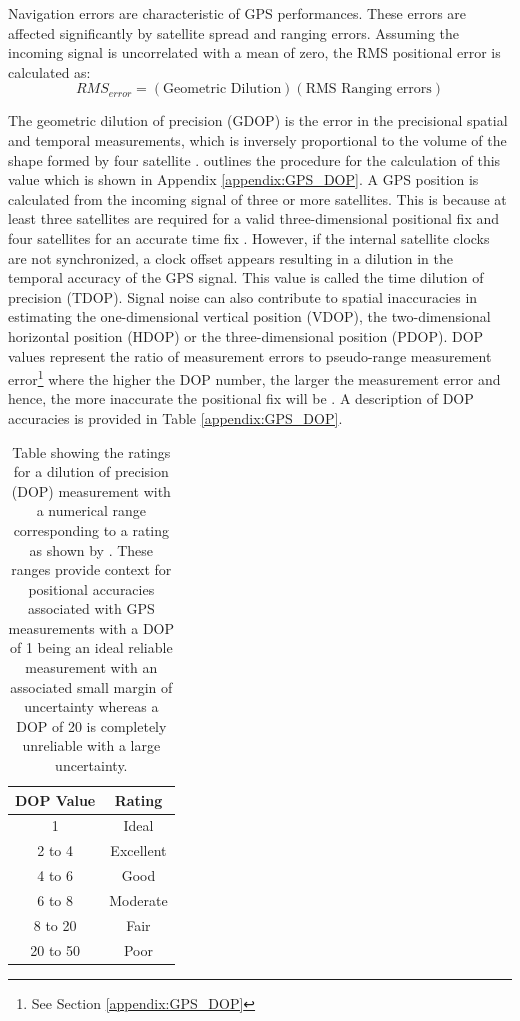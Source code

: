 Navigation errors are characteristic of GPS performances. These errors are affected significantly by satellite spread and ranging errors. Assuming the incoming signal is uncorrelated with a mean of zero, the RMS positional error is calculated as:
\begin{equation}
	RMS_{error} = (\text{Geometric Dilution})(\text{RMS Ranging errors})
\end{equation}

The geometric dilution of precision (GDOP) is the error in the precisional spatial and temporal measurements, which is inversely proportional to the volume of the shape formed by four satellite \cite{jwo2001efficient}. \textcite{jwo2001efficient} outlines the procedure for the calculation of this value which is shown in Appendix \ref{appendix:GPS_DOP}. A GPS position is calculated from the incoming signal of three or more satellites. This is because at least three satellites are required for a valid three-dimensional positional fix and four satellites for an accurate time fix \cite{jwo2001efficient,spilker1996global}. However, if the internal satellite clocks are not synchronized, a clock offset appears resulting in a dilution in the temporal accuracy of the GPS signal. This value is called the time dilution of precision (TDOP). Signal noise can also contribute to spatial inaccuracies in estimating the one-dimensional vertical position (VDOP), the two-dimensional horizontal position (HDOP) or the three-dimensional position (PDOP). DOP values represent the ratio of measurement errors to pseudo-range measurement error\footnote{See Section \ref{appendix:GPS_DOP}} where the higher the DOP number, the larger the measurement error and hence, the more inaccurate the positional fix will be \cite{tahsin2015analysis}. A description of DOP accuracies is provided in Table \ref{appendix:GPS_DOP}.

\begin{table}[H]
	\centering
	\caption{Table showing the ratings for a dilution of precision (DOP) measurement with a numerical range corresponding to a rating as shown by \textcite{tahsin2015analysis}. These ranges provide context for positional accuracies associated with GPS measurements with a DOP of 1 being an ideal reliable measurement with an associated small margin of uncertainty whereas a DOP of 20 is completely unreliable with a large uncertainty. }
	\label{tab:gps_DOP}
	\begin{tabular}{cc}
		\hline
		\textbf{ DOP Value} & \textbf{Rating} \\
		\hline
		\hline
	 1 & Ideal \\
		\hline
	 2 to 4 & Excellent \\
		\hline
	 4 to 6 & Good \\
		\hline
		6 to 8 & Moderate \\
		\hline
		8 to 20 & Fair \\
		\hline
20 to 50 & Poor \\
		\hline
		\hline
	\end{tabular}
\end{table}

